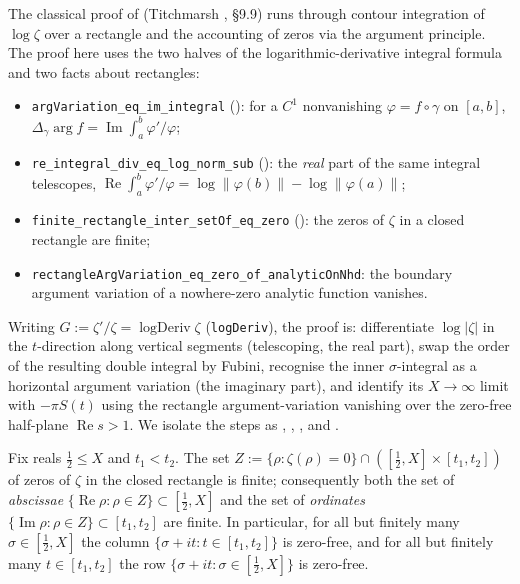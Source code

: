 The classical proof of  (Titchmarsh \cite{TitchmarshZeta}, §9.9)
runs through contour integration of $\log\zeta$ over a rectangle and the
accounting of zeros via the argument principle. The proof here uses the two halves of the
logarithmic-derivative integral formula and two facts about rectangles:
\begin{itemize}
  \item \texttt{argVariation\_eq\_im\_integral} (): for a $C^1$
        nonvanishing $\varphi=f\circ\gamma$ on $[a,b]$,
        $\Delta_\gamma\arg f=\operatorname{Im}\int_a^b \varphi'/\varphi$;
  \item \texttt{re\_integral\_div\_eq\_log\_norm\_sub}
        (): the \emph{real} part of the same integral
        telescopes, $\operatorname{Re}\int_a^b\varphi'/\varphi
        =\log\lVert\varphi(b)\rVert-\log\lVert\varphi(a)\rVert$;
  \item \texttt{finite\_rectangle\_inter\_setOf\_eq\_zero}
        (): the zeros of $\zeta$ in a closed rectangle
        are finite;
  \item \texttt{rectangleArgVariation\_eq\_zero\_of\_analyticOnNhd}: the boundary
        argument variation of a nowhere-zero analytic function vanishes.
\end{itemize}
Writing $G:=\zeta'/\zeta=\operatorname{logDeriv}\zeta$ (\texttt{logDeriv}), the proof
is: differentiate $\log|\zeta|$ in the $t$-direction along vertical segments
(telescoping, the real part), swap the order of the resulting double integral by
Fubini, recognise the inner $\sigma$-integral as a horizontal argument variation
(the imaginary part), and identify its $X\to\infty$ limit with $-\pi S(t)$ using
the rectangle argument-variation vanishing over the zero-free half-plane
$\operatorname{Re}s>1$. We isolate the steps as , , ,  and .

\begin{lemma}
\label{lem:lb_finite_ordinates}
\leanok
{}
Fix reals $\tfrac12\le X$ and $t_1<t_2$. The set
$Z:=\{\rho:\zeta(\rho)=0\}\cap([\tfrac12,X]\times[t_1,t_2])$ of zeros of $\zeta$ in
the closed rectangle is finite; consequently both the set of \emph{abscissae}
$\{\operatorname{Re}\rho:\rho\in Z\}\subset[\tfrac12,X]$ and the set of
\emph{ordinates} $\{\operatorname{Im}\rho:\rho\in Z\}\subset[t_1,t_2]$ are finite.
In particular, for all but finitely many $\sigma\in[\tfrac12,X]$ the column
$\{\sigma+it:t\in[t_1,t_2]\}$ is zero-free, and for all but finitely many
$t\in[t_1,t_2]$ the row $\{\sigma+it:\sigma\in[\tfrac12,X]\}$ is zero-free.
\end{lemma}


